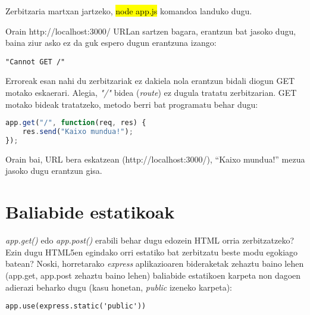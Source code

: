 Zerbitzaria martxan jartzeko, \hl{node app.js} komandoa landuko dugu.

Orain http://localhost:3000/ URLan sartzen bagara, erantzun bat jasoko dugu, baina ziur asko ez da guk espero dugun erantzuna izango:

\begin{lstlisting}[numbers=none]
"Cannot GET /"
\end{lstlisting}

Erroreak esan nahi du zerbitzariak ez dakiela nola erantzun bidali diogun GET motako eskaerari. Alegia, \textit{"/"} bidea (\textit{route}) ez dugula tratatu zerbitzarian.  GET motako bideak tratatzeko, metodo berri bat programatu behar dugu:

\begin{lstlisting}[language=JavaScript]
app.get("/", function(req, res) {
	res.send("Kaixo mundua!");
});
\end{lstlisting}

Orain bai, URL bera eskatzean (http://localhost:3000/), ``Kaixo mundua!'' mezua jasoko dugu erantzun gisa.

%

\section{Baliabide estatikoak}

\textit{app.get()} edo  \textit{app.post()} erabili behar dugu edozein HTML orria zerbitzatzeko? Ezin dugu HTML5en egindako orri estatiko bat zerbitzatu beste modu egokiago batean? Noski, horretarako \textit{express} aplikazioaren bideraketak zehaztu baino lehen (app.get, app.post zehaztu baino lehen) baliabide estatikoen karpeta non dagoen adierazi beharko dugu (kasu honetan, \textit{public} izeneko karpeta):

\begin{lstlisting}
app.use(express.static('public'))
\end{lstlisting}

